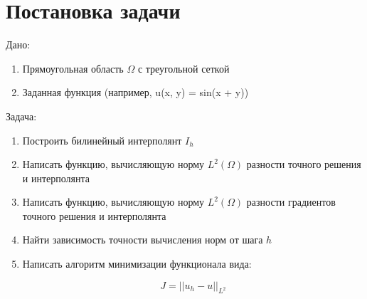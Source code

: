 \documentclass[12pt]{article}
\begin{document}
\section{Постановка задачи}

\quad  Дано:
\begin{enumerate}
\item Прямоугольная область $\Omega$ с треугольной сеткой
\item Заданная функция (например, u(x, y) = sin(x + y))
\end{enumerate} 

Задача:

\begin{enumerate}
\item Построить билинейный интерполянт $I_h$
\item Написать функцию, вычисляющую норму $L^2(\Omega)$ разности точного решения и интерполянта
\item Написать функцию, вычисляющую норму $L^2(\Omega)$ разности градиентов точного решения и интерполянта 
\item Найти зависимость точности вычисления норм от шага $h$
\item Написать алгоритм минимизации функционала вида:

\begin{equation}
J = ||u_h - u||_{L^2}
\end{equation}

\end{enumerate} 
\end{document}
